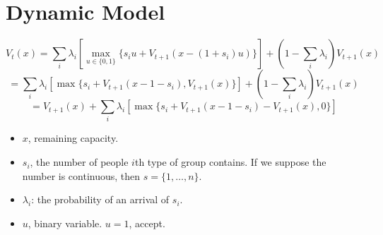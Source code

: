 
\section{Dynamic Model}
    \frame{\sectionpage}

    \begin{frame}
        \centering
          \begin{equation*}
            V_{t}(x) = \sum_{i} \lambda_i \left[\max_{u \in \{0,1\}}\{s_i u + V_{t+1}(x- (1+s_i) u)\}  \right] + (1-\sum_i \lambda_i)V_{t+1}(x)
          \end{equation*}
             \begin{equation*}
               = \sum_{i} \lambda_i \left[\max\{s_i + V_{t+1}(x-1-s_i),V_{t+1}(x)\}\right] + (1-\sum_i \lambda_i)V_{t+1}(x)
             \end{equation*}
             \begin{equation*}
               = V_{t+1}(x) + \sum_{i} \lambda_i \left[\max\{s_i + V_{t+1}(x-1-s_i)-V_{t+1}(x),0\}\right]
             \end{equation*}
    \end{frame}

    \begin{frame}
      \begin{itemize}
        \item $x$, remaining capacity.
        \vspace{10pt}
        \item $s_i$, the number of people $i$th type of group contains. If we suppose the number is continuous, then $s = \{1, \ldots,n\}$.
        \vspace{10pt}
        \item $\lambda_i$: the probability of an arrival of $s_i$.
        \vspace{10pt}
        \item $u$, binary variable. $u=1$, accept.
      \end{itemize}
    \end{frame}

